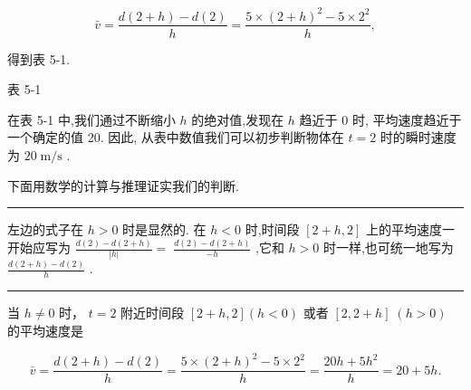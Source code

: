 \documentclass[10pt]{article}
\newcommand{\HRule}{\begin{center}\rule{0.9\linewidth}{0.2mm}\end{center}}
\begin{document}
\[
\bar{v} = \frac{d\left( {2 + h}\right)  - d\left( 2\right) }{h} = \frac{5 \times  {\left( 2 + h\right) }^{2} - 5 \times  {2}^{2}}{h},
\]

得到表 5-1.

表 5-1

\begin{center}
\end{center}

在表 5-1 中,我们通过不断缩小 \(h\) 的绝对值,发现在 \(h\) 趋近于 0 时, 平均速度趋近于一个确定的值 20. 因此, 从表中数值我们可以初步判断物体在 \(t = 2\) 时的瞬时速度为 \({20}\mathrm{\;m}/\mathrm{s}\) .

下面用数学的计算与推理证实我们的判断.



\HRule

左边的式子在 \(h > 0\) 时是显然的. 在 \(h < 0\) 时,时间段 \(\left\lbrack  {2 + h,2}\right\rbrack\) 上的平均速度一开始应写为 \(\frac{d\left( 2\right)  - d\left( {2 + h}\right) }{\left| h\right| } = \; \frac{d\left( 2\right)  - d\left( {2 + h}\right) }{-h}\) ,它和 \(h > 0\) 时一样,也可统一地写为 \(\frac{d\left( {2 + h}\right)  - d\left( 2\right) }{h}\) .

\HRule



当 \(h \neq  0\) 时， \(t = 2\) 附近时间段 \(\left\lbrack  {2 + h,2}\right\rbrack  \left( {h < 0}\right)\) 或者 \(\left\lbrack  {2,2 + h}\right\rbrack \; \left( {h > 0}\right)\) 的平均速度是

\[
\bar{v} = \frac{d\left( {2 + h}\right)  - d\left( 2\right) }{h} = \frac{5 \times  {\left( 2 + h\right) }^{2} - 5 \times  {2}^{2}}{h} = \frac{{20h} + 5{h}^{2}}{h} = {20} + {5h}.
\]
\end{document}
